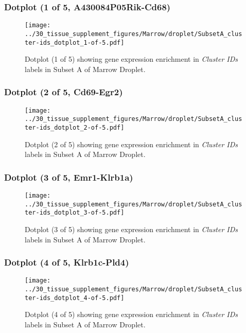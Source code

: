 \clearpage

\subsubsection{Dotplot (1 of 5, A430084P05Rik-Cd68)}
\begin{figure}[h]
\centering
\texttt{[image: ../30\_tissue\_supplement\_figures/Marrow/droplet/SubsetA\_cluster-ids\_dotplot\_1-of-5.pdf]}

\caption{ Dotplot (1 of 5)  showing gene expression enrichment in \emph{Cluster IDs} labels in Subset A of Marrow Droplet. }
\end{figure}


\clearpage

\subsubsection{Dotplot (2 of 5, Cd69-Egr2)}
\begin{figure}[h]
\centering
\texttt{[image: ../30\_tissue\_supplement\_figures/Marrow/droplet/SubsetA\_cluster-ids\_dotplot\_2-of-5.pdf]}

\caption{ Dotplot (2 of 5)  showing gene expression enrichment in \emph{Cluster IDs} labels in Subset A of Marrow Droplet. }
\end{figure}


\clearpage

\subsubsection{Dotplot (3 of 5, Emr1-Klrb1a)}
\begin{figure}[h]
\centering
\texttt{[image: ../30\_tissue\_supplement\_figures/Marrow/droplet/SubsetA\_cluster-ids\_dotplot\_3-of-5.pdf]}

\caption{ Dotplot (3 of 5)  showing gene expression enrichment in \emph{Cluster IDs} labels in Subset A of Marrow Droplet. }
\end{figure}


\clearpage

\subsubsection{Dotplot (4 of 5, Klrb1c-Pld4)}
\begin{figure}[h]
\centering
\texttt{[image: ../30\_tissue\_supplement\_figures/Marrow/droplet/SubsetA\_cluster-ids\_dotplot\_4-of-5.pdf]}

\caption{ Dotplot (4 of 5)  showing gene expression enrichment in \emph{Cluster IDs} labels in Subset A of Marrow Droplet. }
\end{figure}



